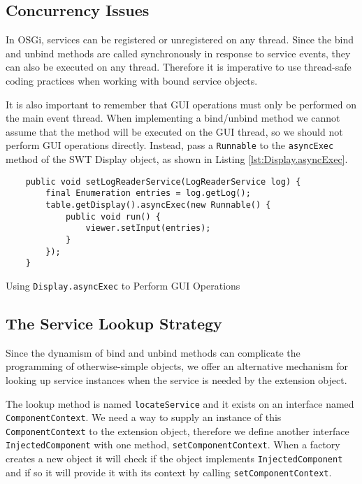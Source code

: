 \documentclass[12pt]{article}
\begin{document}
\subsection{Concurrency Issues}

In OSGi, services can be registered or unregistered on any thread. Since the bind and unbind methods are called synchronously in response to service events, they can also be executed on any thread. Therefore it is imperative to use thread-safe coding practices when working with bound service objects.

It is also important to remember that GUI operations must only be performed on the main event thread. When implementing a bind/unbind method we cannot assume that the method will be executed on the GUI thread, so we should not perform GUI operations directly. Instead, pass a \texttt{Runnable} to the \texttt{asyncExec} method of the SWT Display object, as shown in Listing \ref{lst:Display.asyncExec}.

\begin{program}
	\begin{lstlisting}
	public void setLogReaderService(LogReaderService log) {
		final Enumeration entries = log.getLog();
		table.getDisplay().asyncExec(new Runnable() {
			public void run() {
				viewer.setInput(entries);
			}
		});
	}
	\end{lstlisting}
	\caption{Using \texttt{Display.asyncExec} to Perform GUI Operations}
	\label{lst:Display.asyncExec}
\end{program}

\subsection{The Service Lookup Strategy}

Since the dynamism of bind and unbind methods can complicate the programming of
otherwise-simple objects, we offer an alternative mechanism for looking up
service instances when the service is needed by the extension object.

The lookup method is named \texttt{locateService} and it exists on an interface
named \texttt{ComponentContext}. We need a way to supply an instance of this
\texttt{Comp\-onent\-Con\-text} to the extension object, therefore we define
another interface \texttt{Inj\-ected\-Comp\-onent} with one method,
\texttt{setComponentContext}. When a factory creates a new object it will check
if the object implements \texttt{InjectedComponent} and if so it will provide it
with its context by calling \texttt{setComponentContext}.
\end{document}
